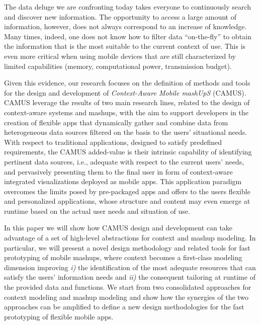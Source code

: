 \label{sec:introduction}

The data deluge we are confronting today takes everyone  to continuously search and discover new information. The opportunity to access a large amount of information, however, does not always correspond to an increase of knowledge. Many times, indeed, one does not know how to filter data ``on-the-fly'' to obtain the information that is the most suitable to the current context of use. This is even more critical when using mobile devices that are still characterized by limited capabilities (memory, computational power, transmission budget). 

Given this evidence, our research focuses on the definition of methods and tools for the design and development of \emph{Context-Aware Mobile mashUpS} (CAMUS)\cite{DBLP:conf/icwe/CorvettaMMQRT15}.
CAMUS leverage the results of two main research lines, related to the design of context-aware systems and mashups, with the aim to support  developers in the creation of  flexible apps that dynamically gather and combine data from heterogeneous data sources filtered on the basis to the users' situational needs. With respect to traditional applications, designed to satisfy predefined requirements, the CAMUS added-value is their intrinsic capability of identifying pertinent data sources, i.e., adequate with respect to the current users' needs, and pervasively
presenting them to the final user in form of context-aware integrated visualizations deployed as mobile apps. This application paradigm overcomes the limits posed by pre-packaged apps and offers to the users flexible and personalized applications, whose structure and content may even emerge at runtime based on the actual user needs and situation of use.

In this paper we will show how CAMUS design and development can take advantage of a set of high-level abstractions for context and mashup modeling. In particular, we will present a novel design methodology and related tools for fast prototyping of mobile mashups, where context becomes a first-class modeling dimension
improving \emph{i)} the identification of the most adequate resources
that can satisfy the users' information needs and \emph{ii)} the
consequent tailoring at runtime of the provided data and
functions. We start from two consolidated approaches for context modeling \cite{DBLP:journals/debu/BolchiniOQST11,DBLP:journals/cacm/BolchiniCOQRST09} and mashup modeling \cite{journals/TWEB2015/CappielloMP15} and  show how the synergies of the two approaches can be amplified to define a new design methodologies for the fast prototyping of flexible mobile apps. %

